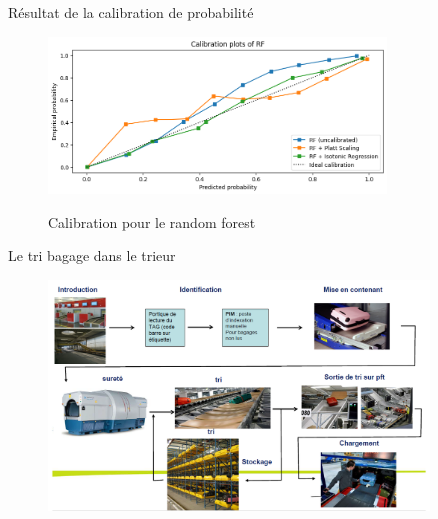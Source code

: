 \documentclass{beamer}
\begin{document}
\begin{frame}{Résultat de la calibration de probabilité}
\begin{figure}[h]
    \centering
    \includegraphics[width=0.8\textwidth]{Calibration_plot_RF.png}\\
    \caption{Calibration pour le random forest}
    \label{fig:Probability calibration for rf}
\end{figure}
\end{frame}


\begin{frame}{Le tri bagage dans le trieur}
    \begin{figure}[h]
    \includegraphics[width=0.9\textwidth]{tri baggage.png}\\
        \label{fig:tri bagage}
    \end{figure}
\end{frame}
\end{document}
